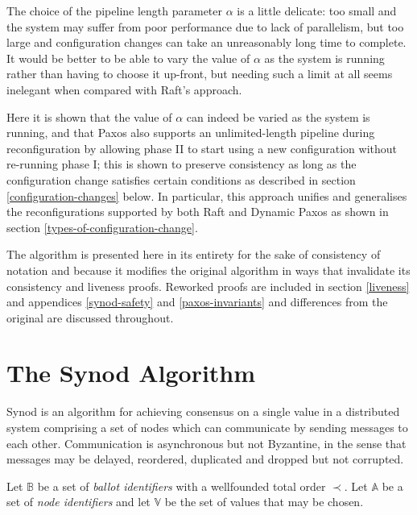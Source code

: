 \documentclass[journal]{IEEEtran}
\begin{document}
The choice of the pipeline length parameter $\alpha$ is a little delicate: too
small and the system may suffer from poor performance due to lack of
parallelism, but too large and configuration changes can take an unreasonably
long time to complete. It would be better to be able to vary the value of
$\alpha$ as the system is running rather than having to choose it up-front, but
needing such a limit at all seems inelegant\cite{reconfiguring-a-state-machine}
when compared with Raft's approach.

Here it is shown that the value of $\alpha$ can indeed be varied as the system
is running, and that Paxos also supports an unlimited-length pipeline during
reconfiguration by allowing phase II to start using a new configuration without
re-running phase I; this is shown to preserve consistency as long as the
configuration change satisfies certain conditions as described in section
\ref{configuration-changes} below. In particular, this approach unifies and
generalises the reconfigurations supported by both Raft and Dynamic Paxos as
shown in section \ref{types-of-configuration-change}.

The algorithm is presented here in its entirety for the sake of consistency of
notation and because it modifies the original algorithm in ways that invalidate
its consistency and liveness proofs. Reworked proofs are included in section
\ref{liveness} and appendices \ref{synod-safety} and \ref{paxos-invariants} and
differences from the original are discussed throughout.

\section{The Synod Algorithm}

Synod\cite{part-time-parliament} is an algorithm for achieving consensus on a
single value in a distributed system comprising a set of nodes which can
communicate by sending messages to each other. Communication is asynchronous
but not Byzantine, in the sense that messages may be delayed, reordered,
duplicated and dropped but not corrupted.

Let $\mathbb B$ be a set of \textit{ballot identifiers} with a wellfounded
total order $\prec$. Let $\mathbb A$ be a set of \textit{node identifiers} and
let $\mathbb V$ be the set of values that may be chosen.

\def\prep#1{\mathbf{prepare}(#1)}
\def\mprom#1#2#3{\mathbf{promised}_{\ge #1}(#2,#3)}
\def\fprom#1#2#3{\mathbf{promised}_{#1}(#2,#3)}
\def\bprom#1#2#3#4{\mathbf{promised}_{#1}(#2,#3;#4)}
\def\prop#1#2{\mathbf{proposed}_{#1}(#2)}
\def\acc#1#2#3{\mathbf{accepted}_{#1}(#2,#3)}
\def\chosen#1#2{\mathbf{chosen}_{#1}(#2)}
\def\owner#1{\mathrm{owner}(#1)}
\end{document}
